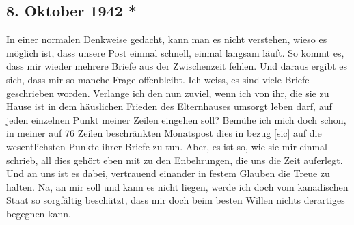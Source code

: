 \subsection{8. Oktober 1942 *}

In einer normalen Denkweise gedacht, kann man es nicht verstehen, wieso es m\"{o}glich ist, dass unsere Post einmal schnell, einmal langsam l\"{a}uft.
So kommt es, dass mir wieder mehrere Briefe aus der Zwischenzeit fehlen.
Und daraus ergibt es sich, dass mir so manche Frage offenbleibt.
Ich weiss, es sind viele Briefe geschrieben worden.
Verlange ich den nun zuviel, wenn ich von ihr, die sie zu Hause ist in dem h\"{a}uslichen Frieden des Elternhauses umsorgt leben darf, auf jeden einzelnen Punkt meiner Zeilen eingehen soll?
Bem\"{u}he ich mich doch schon, in meiner auf 76 Zeilen beschr\"{a}nkten Monatspost dies in bezug {\color{red} [sic] } auf die wesentlichsten Punkte ihrer Briefe zu tun.
Aber, es ist so, wie sie mir einmal schrieb, all dies geh\"{o}rt eben mit zu den Enbehrungen, die uns die Zeit auferlegt.
Und an uns ist es dabei, vertrauend einander in festem Glauben die Treue zu halten.
Na, an mir soll und kann es nicht liegen, werde ich doch vom kanadischen Staat so sorgf\"{a}ltig besch\"{u}tzt, dass mir doch beim besten Willen nichts derartiges begegnen kann.

\clearpage

